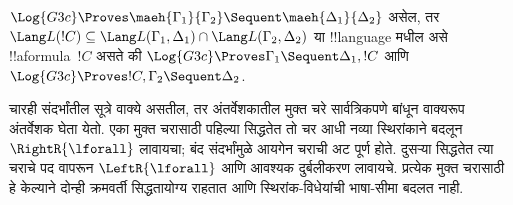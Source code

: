 \documentclass[../../../include/open-logic-section]{subfiles}
\begin{document}
\begin{lem}[माएहाराचे उपप्रमेय]
$\Log{G3c}
\Proves \maeh{\Gamma_1}{\Gamma_2} \Sequent \maeh{\Delta_1}{\Delta_2}$
असेल, तर $\Lang L(!C)
\subseteq \Lang L(\Gamma_1,
\Delta_1) \cap \Lang L(\Gamma_2, \Delta_2)$
या !!{language} मधील असे !!a{formula}~$!C$ असते की
$\Log{G3c}
\Proves \Gamma_1 \Sequent \Delta_1, !C$ आणि
$\Log{G3c} \Proves !C,
\Gamma_2 \Sequent \Delta_2$.
\end{lem}
चारही संदर्भांतील सूत्रे वाक्ये असतील, तर अंतर्वेशकातील
मुक्त चरे सार्वत्रिकपणे बांधून वाक्यरूप अंतर्वेशक घेता येतो.
एका मुक्त चरासाठी पहिल्या सिद्धतेत तो चर आधी नव्या
स्थिरांकाने बदलून $\RightR{\lforall}$ लावायचा; बंद संदर्भांमुळे
आयगेन चराची अट पूर्ण होते. दुसऱ्या सिद्धतेत त्या चराचे
पद वापरून $\LeftR{\lforall}$ आणि आवश्यक दुर्बलीकरण लावायचे.
प्रत्येक मुक्त चरासाठी हे केल्याने दोन्ही क्रमवर्ती सिद्धतायोग्य
राहतात आणि स्थिरांक-विधेयांची भाषा-सीमा बदलत नाही.
\end{document}

